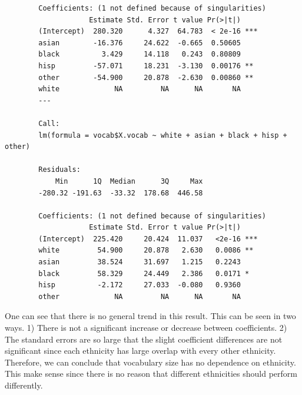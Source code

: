 \documentclass[fleqn]{article}
\begin{document}
	\begin{verbatim}
		Coefficients: (1 not defined because of singularities)
		            Estimate Std. Error t value Pr(>|t|)    
		(Intercept)  280.320      4.327  64.783  < 2e-16 ***
		asian        -16.376     24.622  -0.665  0.50605    
		black          3.429     14.118   0.243  0.80809    
		hisp         -57.071     18.231  -3.130  0.00176 ** 
		other        -54.900     20.878  -2.630  0.00860 ** 
		white             NA         NA      NA       NA    
		---

		Call:
		lm(formula = vocab$X.vocab ~ white + asian + black + hisp + other)

		Residuals:
		    Min      1Q  Median      3Q     Max 
		-280.32 -191.63  -33.32  178.68  446.58 

		Coefficients: (1 not defined because of singularities)
		            Estimate Std. Error t value Pr(>|t|)    
		(Intercept)  225.420     20.424  11.037   <2e-16 ***
		white         54.900     20.878   2.630   0.0086 ** 
		asian         38.524     31.697   1.215   0.2243    
		black         58.329     24.449   2.386   0.0171 *  
		hisp          -2.172     27.033  -0.080   0.9360    
		other             NA         NA      NA       NA
	\end{verbatim}
	One can see that there is no general trend in this result. This can be seen in two ways. 1) There is not a significant increase or decrease between coefficients. 2) The standard errors are so large that the slight coefficient differences are not significant since each ethnicity has large overlap with every other ethnicity. Therefore, we can conclude that vocabulary size has no dependence on ethnicity. This make sense since there is no reason that different ethnicities should perform differently.
\end{document}

